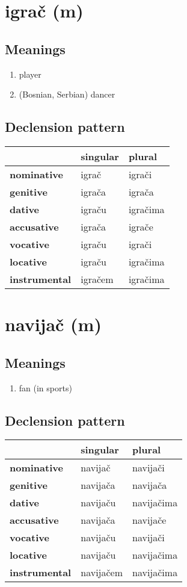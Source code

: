 \filbreak
\section{igrač (m)}
\subsection*{Meanings}
\begin{enumerate}
\item player
\item (Bosnian, Serbian) dancer
\end{enumerate}
\subsection*{Declension pattern}
\begin{tabularx}{\linewidth}{Xll}
\toprule
{} & singular &    plural \\
\midrule
\textbf{nominative  } &    igrač &    igrači \\
\textbf{genitive    } &   igrača &    igrača \\
\textbf{dative      } &   igraču &  igračima \\
\textbf{accusative  } &   igrača &    igrače \\
\textbf{vocative    } &   igraču &    igrači \\
\textbf{locative    } &   igraču &  igračima \\
\textbf{instrumental} &  igračem &  igračima \\
\bottomrule
\end{tabularx}

\filbreak
\section{navijač (m)}
\subsection*{Meanings}
\begin{enumerate}
\item fan (in sports)
\end{enumerate}
\subsection*{Declension pattern}
\begin{tabularx}{\linewidth}{Xll}
\toprule
{} &   singular &      plural \\
\midrule
\textbf{nominative  } &    navijač &    navijači \\
\textbf{genitive    } &   navijača &    navijača \\
\textbf{dative      } &   navijaču &  navijačima \\
\textbf{accusative  } &   navijača &    navijače \\
\textbf{vocative    } &   navijaču &    navijači \\
\textbf{locative    } &   navijaču &  navijačima \\
\textbf{instrumental} &  navijačem &  navijačima \\
\bottomrule
\end{tabularx}

